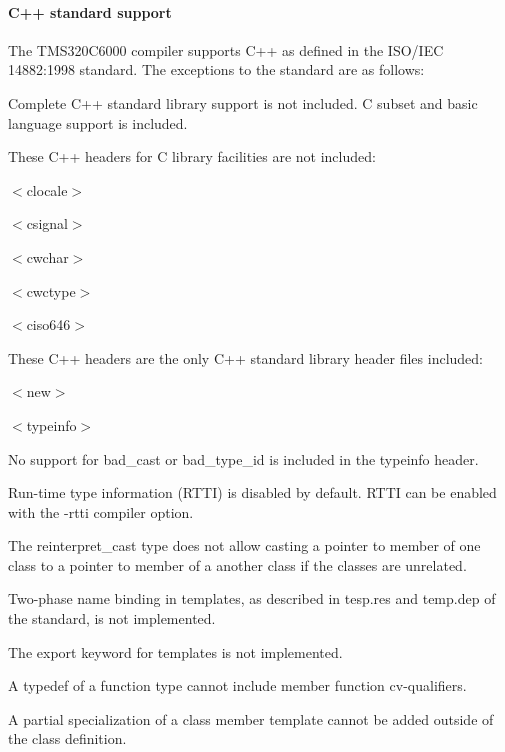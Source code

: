 \hypertarget{a00832_subsubsection__cpp_standard_support_}{}\paragraph{C++ standard support}\label{a00832_subsubsection__cpp_standard_support_}
 The T\+M\+S320\+C6000 compiler supports C++ as defined in the I\+S\+O/\+I\+EC 14882\+:1998 standard. The exceptions to the standard are as follows\+: 
\begin{DoxyItemize}
\item Complete C++ standard library support is not included. C subset and basic language support is included.  
\item These C++ headers for C library facilities are not included\+: 
\begin{DoxyItemize}
\item {\ttfamily $<$clocale$>$ } 
\item {\ttfamily $<$csignal$>$}  
\item {\ttfamily $<$cwchar$>$}  
\item {\ttfamily $<$cwctype$>$}  
\item {\ttfamily $<$ciso646$>$}  
\end{DoxyItemize}
\item These C++ headers are the only C++ standard library header files included\+: 
\begin{DoxyItemize}
\item {\ttfamily $<$new$>$}  
\item {\ttfamily $<$typeinfo$>$}  
\end{DoxyItemize}
\item No support for {\ttfamily bad\+\_\+cast} or {\ttfamily bad\+\_\+type\+\_\+id} is included in the typeinfo header.  
\item Run-\/time type information (R\+T\+TI) is disabled by default. R\+T\+TI can be enabled with the -\/rtti compiler option.  
\item The {\ttfamily reinterpret\+\_\+cast} type does not allow casting a pointer to member of one class to a pointer to member of a another class if the classes are unrelated.  
\item Two-\/phase name binding in templates, as described in tesp.\+res and temp.\+dep of the standard, is not implemented.  
\item The export keyword for templates is not implemented.  
\item A typedef of a function type cannot include member function cv-\/qualifiers.  
\item A partial specialization of a class member template cannot be added outside of the class definition.  
\end{DoxyItemize}

